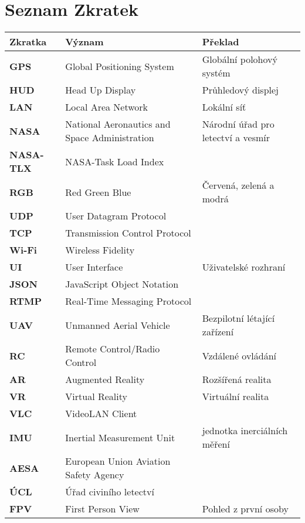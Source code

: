 \documentclass[zadani]{fitthesis} %
\begin{document}
  \maketitle
  \setlength{\parskip}{0pt}

  {\hypersetup{hidelinks}\tableofcontents}
    \chapter*{Seznam Zkratek}
    \bgroup
    \def\arraystretch{1.6}
    \begin{tabular}{ >{\bfseries}p{6.5em} p{5.9cm}  p{5.9cm} }
    \bfseries{Zkratka} & \bfseries{Význam} & \bfseries{Překlad} \\ 
    \hline
    GPS & Global Positioning System & Globální polohový systém\\ 
    HUD& Head Up Display & Průhledový displej\\ 
    LAN & Local Area Network & Lokální síť\\ 
    NASA & National Aeronautics and Space Administration & Národní úřad pro letectví a vesmír \\ 
    NASA-TLX & NASA-Task Load Index  \\  
    RGB & Red Green Blue & Červená, zelená a modrá \\ 
    UDP & User Datagram Protocol& \\ 
    TCP&Transmission Control Protocol& \\ 
    Wi-Fi &Wireless Fidelity& \\ 
    UI & User Interface & Uživatelské rozhraní \\ 
    JSON &JavaScript Object Notation &  \\ 
    RTMP & Real-Time Messaging Protocol &  \\ 
    UAV&Unmanned Aerial Vehicle & Bezpilotní létající zařízení\\ 
    RC &Remote Control/Radio Control & Vzdálené ovládání\\ 
    AR &Augmented Reality & Rozšířená realita\\ 
    VR &Virtual Reality & Virtuální realita\\ 
    VLC &VideoLAN Client &\\ 
    IMU &Inertial Measurement Unit &  jednotka inerciálních měření\\ 
    AESA&European Union Aviation Safety Agency&\\
    ÚCL &Úřad civiního letectví&\\
    FPV &First Person View&Pohled z první osoby\\
    \end{tabular}
    \egroup
    
\end{document}
